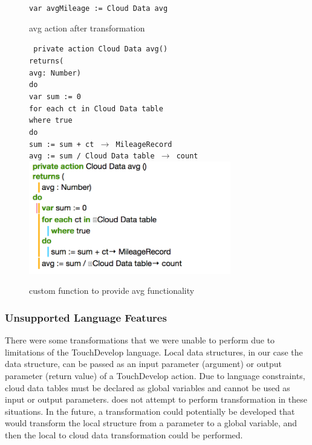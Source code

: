 \documentclass{sigplanconf}
\begin{document}
\begin{figure}[htbp!]
\begin{center}
\texttt{var avgMileage := Cloud Data avg}
\nocaptionrule
\caption{avg action after transformation}
\label{fig:CloudTable_avg}
\end{center}

\end{figure}
\begin{figure}[htbp!]
\texttt{ private action Cloud Data avg()\\ 
returns(\\
avg: Number)\\
do\\
var sum := 0\\
for each ct in Cloud Data table\\
where true\\
do\\
sum := sum + ct $\rightarrow$ MileageRecord\\
avg := sum / Cloud Data table $\rightarrow$ count}
\includegraphics[width=250pt]{images/HelperFunction}
\nocaptionrule
\caption{custom function to provide avg functionality}
\label{fig:CloudTable_avg_fun}
\end{figure}

\subsubsection{Unsupported Language Features}
\label{sec:unsupportedLanguageFeatures}
There were some transformations that we were unable to perform due to limitations of the TouchDevelop language.  Local data structures, in our case the \NC{} data structure, can be passed as an input parameter (argument) or output parameter (return value) of a TouchDevelop action.  Due to language constraints, cloud data tables must be declared as global variables and cannot be used as input or output parameters.  \tool does not attempt to perform transformation in these situations.  In the future, a transformation could potentially be developed that would transform the local structure from a parameter to a global variable, and then the local to cloud data transformation could be performed.
\end{document}
